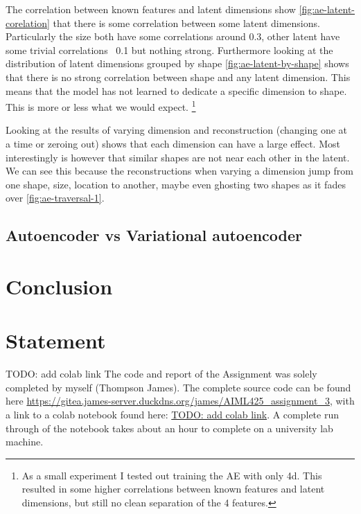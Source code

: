 \documentclass[conference,a4paper]{IEEEtran}
\begin{document}
The correlation between known features and latent dimensions show \ref{fig:ae-latent-corelation} that there is some  correlation between some latent dimensions. Particularly the size both have some correlations around 0.3, other latent have some trivial correlations ~0.1 but nothing strong. Furthermore looking at the distribution of latent dimensions grouped by shape \ref{fig:ae-latent-by-shape} shows that there is no strong correlation between shape and any latent dimension. This means that the model has not learned to dedicate a specific dimension to shape. This is more or less what we would expect. \footnote{As a small experiment I tested out training the AE with only 4d. This resulted in some higher correlations between known features and latent dimensions, but still no clean separation of the 4 features.}

Looking at the results of varying dimension and reconstruction (changing one at a time or zeroing out) shows that each dimension can have a large effect. Most interestingly is however that similar shapes are not near each other in the latent. We can see this because the reconstructions when varying a dimension jump from one shape, size, location to another, maybe even ghosting two shapes as it fades over \ref{fig:ae-traversal-1}.

\subsection{Autoencoder vs Variational autoencoder}


\section{Conclusion}

\newpage
\section*{Statement}

TODO: add colab link
The code and report of the Assignment was solely completed by myself (Thompson James). The complete source code can be found here \url{https://gitea.james-server.duckdns.org/james/AIML425\_assignment\_3}, with a link to a colab notebook found here: \url{TODO: add colab link}. A complete run through of the notebook takes about an hour to complete on a university lab machine.
\end{document}
